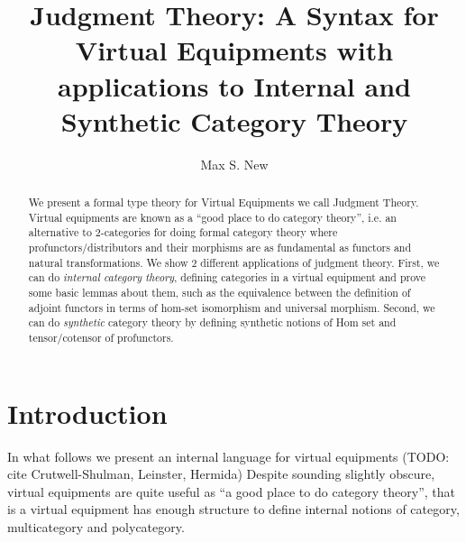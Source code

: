 \documentclass{article}
\begin{document}
\newtheorem{theorem}{Theorem}
\newtheorem{lemma}{Lemma}
\newtheorem{construction}{Construction}
\newtheorem{definition}{Definition}
\newcommand{\pto}{\nrightarrow}
\newcommand{\pfrom}{\nleftarrow}
\newcommand{\vcat}{\mathcal}
\newcommand{\cat}{\mathbbm}
\newcommand{\vtkmnd}{\mathbb{K}\text{Mod} (\vcat{V},T)}
\newcommand{\rmod}{\text{RMod}}
\newcommand{\lmod}{\text{LMod}}

\newcommand{\id}{\textrm{id}}
\newcommand{\for}{\textrm{for}\,}
\newcommand{\when}{\textrm{when}\,}
\newcommand{\lett}{\textrm{let}\,}
\newcommand{\sort}{\,\,\textrm{sort}}
\newcommand{\ctx}{\,\,\textrm{context}}
\newcommand{\prof}{\,\,\textrm{span}}
\newcommand{\subst}{\,\,\textrm{subst}}
\newcommand{\sigctx}{\,\,\textrm{sig-ctx}}
\newcommand{\sig}{\,\,\textrm{sig}}
\newcommand{\pipe}{\mathrel{|}}

\title{Judgment Theory: A Syntax for Virtual Equipments with applications to Internal and Synthetic Category Theory}
\author{Max S. New}

\maketitle

\begin{abstract}
  We present a formal type theory for Virtual Equipments we call
  Judgment Theory. Virtual equipments are known as a ``good place to
  do category theory'', i.e. an alternative to 2-categories for doing
  formal category theory where profunctors/distributors and their
  morphisms are as fundamental as functors and natural
  transformations. We show 2 different applications of judgment
  theory. First, we can do \emph{internal category theory}, defining
  categories in a virtual equipment and prove some basic lemmas about
  them, such as the equivalence between the definition of adjoint
  functors in terms of hom-set isomorphism and universal
  morphism. Second, we can do \emph{synthetic} category theory by
  defining synthetic notions of Hom set and tensor/cotensor of
  profunctors.
\end{abstract}

\section{Introduction}

In what follows we present an internal language for virtual equipments
(TODO: cite Crutwell-Shulman, Leinster, Hermida)
%
Despite sounding slightly obscure, virtual equipments are quite useful
as ``a good place to do category theory'', that is a virtual equipment
has enough structure to define internal notions of category,
multicategory and polycategory.
\end{document}
